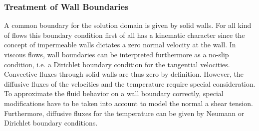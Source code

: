 \subsubsection{Treatment of Wall Boundaries}
\label{sec:walls}
    
A common boundary for the solution domain is given by solid walls. For all kind of flows this boundary condition first of all has a kinematic character since the concept of impermeable walls dictates a zero normal velocity at the wall. In viscous flows, wall boundaries can be interpreted furthermore as a no-slip condition, i.e. a Dirichlet boundary condition for the tangential velocities. Convective fluxes through solid walls are thus zero by definition. However, the diffusive fluxes of the velocities and the temperature require special consideration. To approximate the fluid behavior on a wall boundary correctly, special modifications have to be taken into account to model the normal a shear tension. Furthermore, diffusive fluxes for the temperature can be given by Neumann or Dirichlet boundary conditions.

